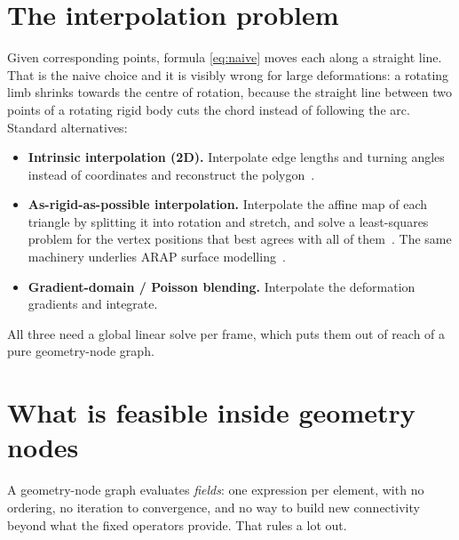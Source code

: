 \documentclass[11pt,a4paper]{article}
\begin{document}
\section{The interpolation problem}

Given corresponding points, formula \eqref{eq:naive} moves each along a
straight line. That is the naive choice and it is visibly wrong for large
deformations: a rotating limb shrinks towards the centre of rotation,
because the straight line between two points of a rotating rigid body cuts
the chord instead of following the arc. Standard alternatives:

\begin{itemize}[leftmargin=1.4em]
  \item \textbf{Intrinsic interpolation (2D).} Interpolate edge lengths and
    turning angles instead of coordinates and reconstruct the
    polygon~\cite{sederberg1992,sederberg1993}.
  \item \textbf{As-rigid-as-possible interpolation.} Interpolate the affine
    map of each triangle by splitting it into rotation and stretch, and
    solve a least-squares problem for the vertex positions that best agrees
    with all of them~\cite{alexa2000}. The same machinery underlies ARAP
    surface modelling~\cite{sorkine2007}.
  \item \textbf{Gradient-domain / Poisson blending.} Interpolate the
    deformation gradients and integrate.
\end{itemize}

All three need a global linear solve per frame, which puts them out of
reach of a pure geometry-node graph.

\section{What is feasible inside geometry nodes}

A geometry-node graph evaluates \emph{fields}: one expression per element,
with no ordering, no iteration to convergence, and no way to build new
connectivity beyond what the fixed operators provide. That rules a lot out.
\end{document}
